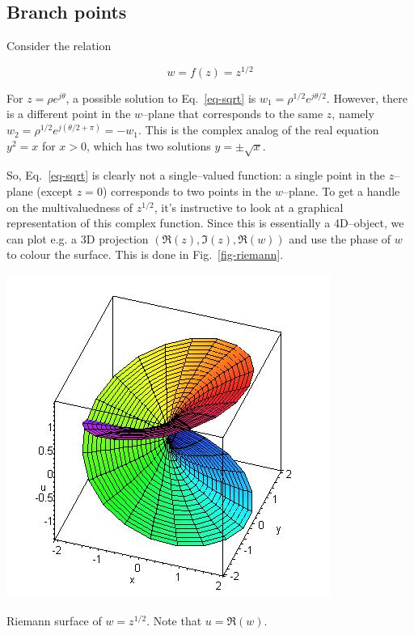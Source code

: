 \subsection*{Branch points}

Consider the relation

\begin{equation}
w = f(z) = z^{1/2} \label{eq-sqrt}
\end{equation} 

For $z=\rho e^{j\theta}$, a possible solution to Eq.~\ref{eq-sqrt} is $w_1 =
\rho^{1/2} e^{j\theta/2}$. However, there is a different point in the $w$--plane
that corresponds to the same $z$, namely $w_2 = \rho^{1/2} e^{j(\theta/2+\pi)} =
-w_1$. This is the complex analog of the real equation $y^2 = x$ for $x > 0$,
which has two solutions $y = \pm \sqrt{x}$.

So, Eq.~\ref{eq-sqrt} is clearly not a single--valued function: a single point
in the $z$--plane (except $z=0$) corresponds to two points in the $w$--plane. To
get a handle on the multivaluedness of $z^{1/2}$, it's instructive to look at a
graphical representation of this complex function. Since this is essentially a
4D--object, we can plot e.g. a 3D projection $(\Re(z),\Im(z),\Re(w))$ and use
the phase of $w$ to colour the surface. This is done in Fig.~\ref{fig-riemann}.

\begin{marginfigure}
\centering
\includegraphics{complex/figures/riemann}
\caption{Riemann surface of $w=z^{1/2}$. Note that $u=\Re(w)$. }
\label{fig-riemann}
\end{marginfigure}

